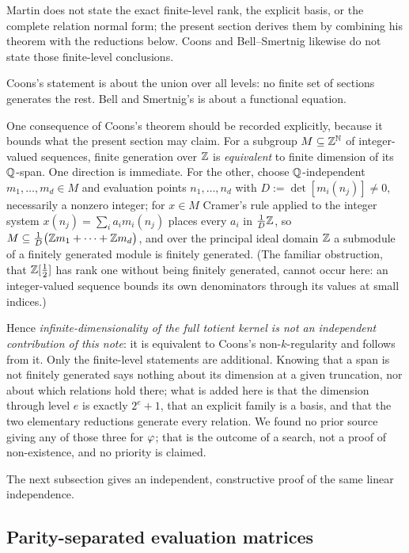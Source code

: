 \documentclass[11pt]{article}
\begin{document}
Martin does not state the exact finite-level
rank, the explicit basis, or the complete relation normal form; the present
section derives them by combining his theorem with the reductions below.
Coons and Bell--Smertnig likewise do not state those finite-level conclusions.

Coons's statement is about the union over all levels: no finite set of sections
generates the rest.  Bell and Smertnig's is about a functional equation.

One consequence of Coons's theorem should be recorded explicitly, because it
bounds what the present section may claim.  For a subgroup $M\subseteq\mathbb{Z}^{\mathbb{N}}$
of integer-valued sequences, finite generation over $\mathbb{Z}$ is \emph{equivalent} to
finite dimension of its $\mathbb{Q}$-span.  One direction is immediate.  For the other,
choose $\mathbb{Q}$-independent $m_1,\dots,m_d\in M$ and evaluation points
$n_1,\dots,n_d$ with $D:=\det[m_i(n_j)]\neq0$, necessarily a nonzero integer;
for $x\in M$ Cramer's rule applied to the integer system
$x(n_j)=\sum_i a_im_i(n_j)$ places every $a_i$ in $\tfrac1D\mathbb{Z}$, so
$M\subseteq\tfrac1D\bigl(\mathbb{Z} m_1+\dots+\mathbb{Z} m_d\bigr)$, and over the principal
ideal domain $\mathbb{Z}$ a submodule of a finitely generated module is finitely
generated.  (The familiar obstruction, that $\mathbb{Z}[\tfrac12]$ has rank one without
being finitely generated, cannot occur here: an integer-valued sequence bounds
its own denominators through its values at small indices.)

Hence \emph{infinite-dimensionality of the full totient kernel is not an
independent contribution of this note}: it is equivalent to Coons's
non-$k$-regularity and follows from it.  Only the finite-level statements are
additional.  Knowing that a span is not finitely generated says nothing
about its dimension at a given truncation, nor about which relations hold
there; what is added here is that
the dimension through level $e$ is exactly $2^e+1$, that an explicit family is
a basis, and that the two elementary reductions generate every relation.  We
found no prior source giving any of those three for $\varphi$; that is the outcome
of a search, not a proof of non-existence, and no priority is claimed.

The next subsection gives an independent, constructive proof of the same
linear independence.

\subsection{Parity-separated evaluation matrices}
\end{document}
